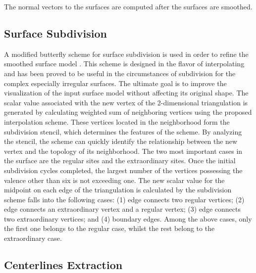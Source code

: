 The normal vectors to the surfaces are computed after the surfaces are smoothed.

\subsection{Surface Subdivision}

A modified butterfly scheme for surface subdivision is used in order to refine the smoothed surface model \cite{Zorin1996}.
This scheme is designed in the flavor of interpolating and has been proved to be useful in the circumstances of subdivision for the complex especially irregular surfaces.
The ultimate goal is to improve the visualization of the input surface model without affecting its original shape.
The scalar value associated with the new vertex of the 2-dimensional triangulation is generated by calculating weighted sum of neighboring vertices using the proposed interpolation scheme. %
These vertices located in the neighborhood form the subdivision stencil, which determines the features of the scheme.
By analyzing the stencil, the scheme can quickly identify the relationship between the new vertex and the topology of its neighborhood.
The two most important cases in the surface are the regular sites and the extraordinary sites.
Once the initial subdivision cycles completed, the largest number of the vertices possessing the valence other than six is not exceeding one.
The new scalar value for the midpoint on each edge of the triangulation is calculated by the subdivision scheme falls into the following cases:
(1) edge connects two regular vertices;
(2) edge connects an extraordinary vertex and a regular vertex;
(3) edge connects two extraordinary vertices; and
(4) boundary edges.
Among the above cases, only the first one belongs to the regular case, whilst the rest belong to the extraordinary case.

\subsection{Centerlines Extraction}

